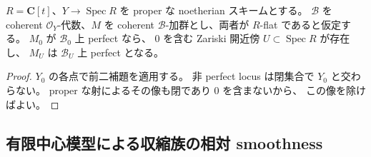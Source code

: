 \begin{proposition}
\label{cmo:prop:proper-perfect-spread}
$R=\mathbf C[t]$、$Y\to\operatorname{Spec}R$ を proper な
noetherian スキームとする。
$\mathcal B$ を coherent $\mathcal O_Y$-代数、$M$ を coherent
$\mathcal B$-加群とし、両者が $R$-flat であると仮定する。
$M_0$ が $\mathcal B_0$ 上 perfect なら、
$0$ を含む Zariski 開近傍 $U\subset\operatorname{Spec}R$ が存在し、
$M_U$ は $\mathcal B_U$ 上 perfect となる。
\end{proposition}
\begin{proof}
$Y_0$ の各点で前二補題を適用する。
非 perfect locus は閉集合で $Y_0$ と交わらない。
proper な射によるその像も閉であり $0$ を含まないから、
この像を除けばよい。
\end{proof}


\subsection{有限中心模型による収縮族の相対 smoothness}

